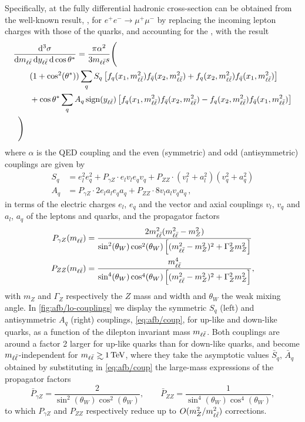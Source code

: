 Specifically, at \lo the fully differential hadronic cross-section can be
obtained from the well-known result, \cite{Peskin:1995ev}, for
$e^+e^-\to\mu^+\mu^-$ by replacing the incoming lepton charges  with those of
the quarks, and accounting for the \pdfs, with the result
\begin{align}
    \frac{\dd^3 \sigma}{\dd \mll \, \dd \yll \, \dd\cos\theta^*} &= 
    \frac{\pi \alpha^2}{3 \mll s} \Bigg( \nonumber\\
    &\hspace*{-2cm} (1+\cos^2({\theta^*})) \sum_q S_q \left[f_q(x_1,\mll^2) f_{\bar{q}}(x_2,\mll^2) + f_q(x_2,\mll^2) f_{\bar{q}}(x_1,\mll^2) \right] \nonumber\\
    &\hspace*{-2cm} + \cos\theta^* \sum_q A_q \sign (\yll) \left[ f_q(x_1,\mll^2) f_{\bar{q}}(x_2,\mll^2) - f_q(x_2,\mll^2) f_{\bar{q}}(x_1,\mll^2)\right] \nonumber\\
    &\hspace*{-2.5cm}\Bigg)
    \label{eq:afb/lo-triple-diff}
\end{align}
where  $\alpha$ is the QED coupling and the even (symmetric) and
odd  (antisymmetric) couplings are given by
\begin{align}
  \label{eq:afb/coup}
    S_q &= e_l^2 e_q^2 + P_{\gamma Z} \cdot  e_l v_l e_q v_q + P_{ZZ} \cdot  (v_l^2+a_l^2)(v_q^2+a_q^2) \nonumber \\
    A_q &= P_{\gamma Z} \cdot 2 e_l a_l e_q a_q  + P_{ZZ} \cdot 8 v_l a_l  v_q a_q \, ,
\end{align}
in terms of the electric charges  $e_l$, $e_q$ and the vector and
axial couplings $v_l$, $v_q$ and $a_l$, $a_q$  of the leptons and
quarks, and the propagator factors
\begin{align}\label{eq:afb/propgz}
    P_{\gamma Z}(m_{\ell\bar{\ell}}) &= \frac{2m_{\ell\bar{\ell}}^2 (m_{\ell\bar{\ell}}^2  - m_Z^2)}{\sin^2(\theta_W) \cos^2(\theta_W)\left[(m_{\ell\bar{\ell}}^2 - m_Z^2)^2 + \Gamma_Z^2 m_Z^2\right]}\\
\label{eq:afb/propzz}
    P_{ZZ}(m_{\ell\bar{\ell}}) &= \frac{m_{\ell\bar{\ell}}^4}{\sin^4(\theta_W) \cos^4(\theta_W)\left[(m_{\ell\bar{\ell}}^2 - m_Z^2)^2 + \Gamma_Z^2 m_Z^2\right]},
\end{align}
with $m_Z$  and $\Gamma_Z$ respectively the $Z$ mass and width and $\theta_W$ the weak mixing angle.
%
In \cref{fig:afb/lo-couplings} we display the
symmetric $S_q$ (left) and antisymmetric $A_q$ (right)
couplings, \cref{eq:afb/coup}, for up-like and
down-like quarks, as a function of 
the dilepton invariant mass $m_{\ell\bar{\ell}}$.
%
Both couplings are around a factor 2 larger for
up-like quarks than for down-like quarks, and
become $m_{\ell\bar{\ell}}$-independent for $\mll \gsim \SI{1}{\tera\electronvolt}$, where they take
the asymptotic values $\bar S_q$, $\bar A_q$ obtained by
substituting in \cref{eq:afb/coup} the large-mass expressions of
the propagator factors
\begin{equation}\label{eq:afb/propasympt}
    \bar P_{\gamma Z} = \frac{2}{\sin^2(\theta_W)\cos^2(\theta_W)},
    \qquad 
    \bar P_{ZZ} = \frac{1}{\sin^4(\theta_W) \cos^4(\theta_W)},
\end{equation}
to which $P_{\gamma Z}$ and $P_{ZZ}$ respectively reduce up to $O(m^2_Z/m_{\ell\bar{\ell}}^2)$ corrections.

